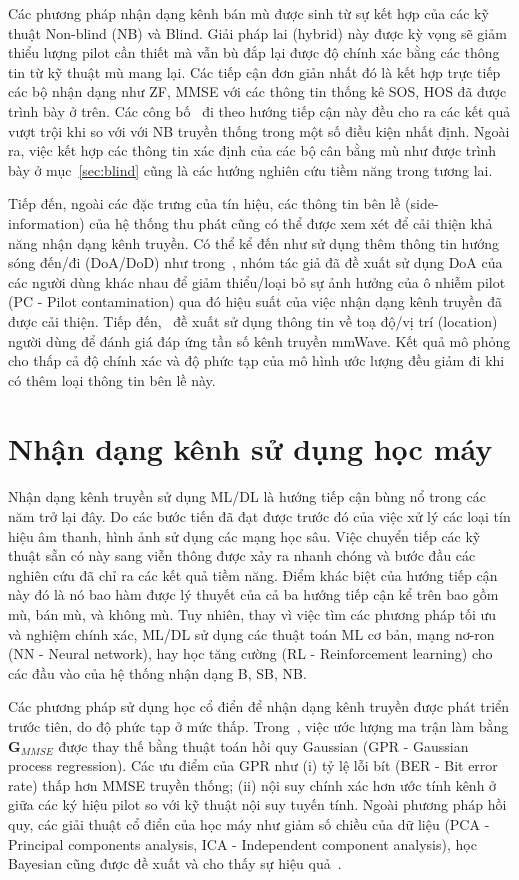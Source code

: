 Các phương pháp nhận dạng kênh bán mù được sinh từ sự kết hợp của các kỹ thuật Non-blind (NB) và Blind. Giải pháp lai (hybrid) này được kỳ vọng sẽ giảm thiểu lượng pilot cần thiết mà vẫn bù đắp lại được độ chính xác bằng các thông tin từ kỹ thuật mù mang lại. Các tiếp cận đơn giản nhất đó là kết hợp trực tiếp các bộ nhận dạng như ZF, MMSE với các thông tin thống kê SOS, HOS đã được trình bày ở trên. Các công bố~\cite{Wan2008, Ladaycia2019, Rekik2021} đi theo hướng tiếp cận này đều cho ra các kết quả vượt trội khi so với với NB truyền thống trong một số điều kiện nhất định. Ngoài ra, việc kết hợp các thông tin xác định của các bộ cân bằng mù như được trình bày ở mục~\ref{sec:blind} cũng là các hướng nghiên cứu tiềm năng trong tương lai.

Tiếp đến, ngoài các đặc trưng của tín hiệu, các thông tin bên lề (side-information) của hệ thống thu phát cũng có thể được xem xét để cải thiện khả năng nhận dạng kênh truyền. Có thể kể đến như sử dụng thêm thông tin hướng sóng đến/đi (DoA/DoD) như trong~\cite{Wang2016}, nhóm tác giả đã đề xuất sử dụng DoA của các người dùng khác nhau để giảm thiểu/loại bỏ sự ảnh hưởng của ô nhiễm pilot (PC - Pilot contamination) qua đó hiệu suất của việc nhận dạng kênh truyền đã được cải thiện. Tiếp đến,~\cite{Lin2020} đề xuất sử dụng thông tin về toạ độ/vị trí (location) người dùng để đánh giá đáp ứng tần số kênh truyền mmWave. Kết quả mô phỏng cho thấp cả độ chính xác và độ phức tạp của mô hình ước lượng đều giảm đi khi có thêm loại thông tin bên lề này.

\section{Nhận dạng kênh sử dụng học máy}

Nhận dạng kênh truyền sử dụng ML/DL là hướng tiếp cận bùng nổ trong các năm trở lại đây. Do các bước tiến đã đạt được trước đó của việc xử lý các loại tín hiệu âm thanh, hình ảnh sử dụng các mạng học sâu. Việc chuyển tiếp các kỹ thuật sẵn có này sang viễn thông được xảy ra nhanh chóng và bước đầu các nghiên cứu đã chỉ ra các kết quả tiềm năng. Điểm khác biệt của hướng tiếp cận này đó là nó bao hàm được lý thuyết của cả ba hướng tiếp cận kể trên bao gồm mù, bán mù, và không mù. Tuy nhiên, thay vì việc tìm các phương pháp tối ưu và nghiệm chính xác, ML/DL sử dụng các thuật toán ML cơ bản, mạng nơ-ron (NN - Neural network), hay học tăng cường (RL - Reinforcement learning) cho các đầu vào của hệ thống nhận dạng B, SB, NB.

Các phương pháp sử dụng học cổ điển để nhận dạng kênh truyền được phát triển trước tiên, do độ phức tạp ở mức thấp. Trong~\cite{Simeon2022}, việc ước lượng ma trận làm bằng $\mathbf{G}_{MMSE}$ được thay thế bằng thuật toán hồi quy Gaussian (GPR - Gaussian process regression). Các ưu điểm của GPR như (i) tỷ lệ lỗi bít (BER - Bit error rate) thấp hơn MMSE truyền thống; (ii) nội suy chính xác hơn ước tính kênh ở giữa các ký hiệu pilot so với kỹ thuật nội suy tuyến tính. Ngoài phương pháp hồi quy, các giải thuật cổ điển của học máy như giảm số chiều của dữ liệu (PCA - Principal components analysis, ICA - Independent component analysis), học Bayesian cũng được đề xuất và cho thấy sự hiệu quả~\cite{vilas2022}.

